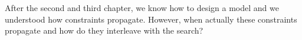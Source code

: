 After the second and third chapter, we know how to design a model and we understood how constraints propagate. However, when actually these constraints propagate
and how do they interleave with the search?
